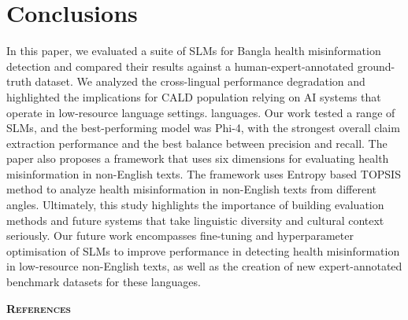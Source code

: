 \documentclass[]{article}
\begin{document}
\section{Conclusions}

In this paper, we evaluated a suite of SLMs for Bangla health
misinformation detection and compared their results against a
human-expert-annotated ground-truth dataset. We analyzed the
cross-lingual performance degradation and highlighted the implications
for CALD population relying on AI systems that operate in low-resource language settings.
languages. Our work tested a range of SLMs, and the best-performing model
was Phi-4, with the strongest overall claim extraction performance and
the best balance between precision and recall. The paper also proposes a
framework that uses six dimensions for evaluating health misinformation
in non-English texts. The framework uses Entropy based TOPSIS method to
analyze health misinformation in non-English texts from different
angles. Ultimately, this study highlights the importance of building
evaluation methods and future systems that take linguistic diversity and
cultural context seriously. Our future work encompasses fine-tuning and hyperparameter
optimisation of SLMs to improve performance in detecting health
misinformation in low-resource non-English texts, as well as
the creation of new expert-annotated benchmark datasets for
these languages.

\textbf{\textsc{References}}
\end{document}
